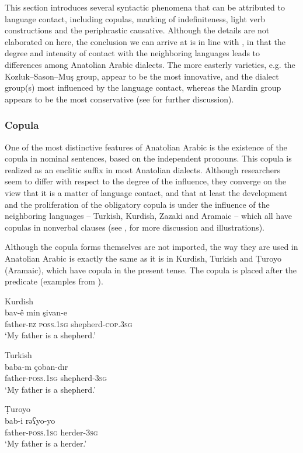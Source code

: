 \documentclass[output=paper]{langsci/langscibook}
\begin{document}
This section introduces several syntactic phenomena that can be attributed to language contact, including copulas, marking of indefiniteness, light verb constructions and the periphrastic causative. Although the details are not elaborated on here, the conclusion we can arrive at is in line with \cite{Ingham2005}, in that the degree and intensity of contact with the neighboring languages leads to differences among Anatolian Arabic dialects. The more easterly varieties, e.g. the Kozluk--Sason--Mu\c{s} group, appear to be the most innovative, and the dialect group(s) most influenced by the language contact, whereas the Mardin group appears to be the most conservative (see \citealt{Akkus2017,Jastrow2011anatolian} for further discussion).

\subsubsection{Copula}
One of the most distinctive features of Anatolian Arabic is the existence of the copula in nominal sentences, based on the independent pronouns. This copula is realized as an enclitic suffix in most Anatolian dialects. Although researchers seem to differ with respect to the degree of the influence, they converge on the view that it is a matter of language contact, and that at least the development and the proliferation of the obligatory copula is under the influence of the neighboring languages -- Turkish, Kurdish, Zazaki and Aramaic -- which all have copulas in nonverbal clauses (see \citealt{Lahdo2009,Grigore2007article,Palva2011,Talay2007,Jastrow2011anatolian,Akkus2016,Akkus2017,AkkusBenmamoun2018}, for more discussion and illustrations). 

Although the copula forms themselves are not imported, the way they are used in Anatolian Arabic is exactly the same as it is in Kurdish, Turkish and Ṭuroyo (Aramaic), which have copula in the present tense. The copula is placed after the predicate (examples from \citealt{Grigore2007article}).  

\begin{exe}
\ex \label{cop} 
		\begin{xlist}
		\ex Kurdish \\\label{copkrm}\gll bav-ê min şivan-e		\\
    father-\textsc{ez} \textsc{poss.1sg}		shepherd-\textsc{cop.3sg} \\
       \glt `My father is a shepherd.'

	\ex Turkish \\
	\label{coptk} \gll baba-m 		çoban-dır\\
	father-\textsc{poss.1sg}		shepherd-\textsc{3sg}\\
        \glt  `My father is a shepherd.'
	
		\ex Ṭuroyo\\ \label{copara} \gll  bab-i		rəʕyo-yo\\
		father-\textsc{poss.1sg}		herder-\textsc{3sg}\\
      \glt  `My father is a herder.'
        \end{xlist}
      
\end{exe}
\end{document}
